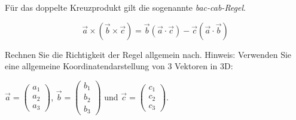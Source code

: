 \begin{ExerciseBlock}
Für das doppelte Kreuzprodukt gilt die sogenannte \textit{bac-cab-Regel}.

\begin{equation*}
	\vec{a} \times \left( \vec{b} \times \vec{c} \right)
	=
	\vec{b} \left( \vec{a} \cdot \vec{c} \right)
	-
	\vec{c} \left( \vec{a} \cdot \vec{b} \right)
\end{equation*}

Rechnen Sie die Richtigkeit der Regel allgemein nach. Hinweis: Verwenden Sie eine allgemeine Koordinatendarstellung von 3 Vektoren in 3D: \par
\begin{center} 
$ \vec{a}=\left(\begin{array}{c} a_1 \\ a_2 \\ a_3 \end{array}\right)$, 
$\vec{b}=\left(\begin{array}{c} b_1 \\ b_2 \\ b_3 \end{array}\right)$ und ${\vec{c}}=\left(\begin{array}{c} c_1 \\ c_2 \\ c_3 \end{array}\right)$. 
\end{center}

\end{ExerciseBlock}
